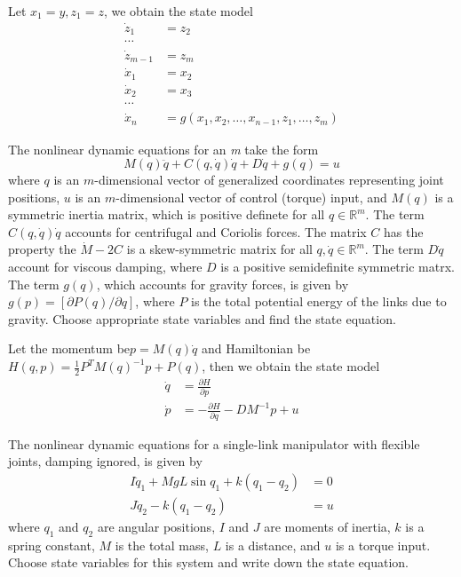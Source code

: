 \begin{solution}
Let $x_1=y,z_1=z$, we obtain the state model
\begin{align*}
\dot{z}_1 & = z_2\\
\cdots \\
\dot{z}_{m-1} & = z_m\\
\dot{x}_1 & = x_2\\ 
\dot{x}_2 & = x_3\\
\cdots \\
\dot{x}_n & = g(x_1,x_2,\dots,x_{n-1},z_1,\dots,z_{m})
\end{align*}
\end{solution}

\begin{exer}
The nonlinear dynamic equations for an \textit{m} take the form
\begin{equation*}
M(q)\ddot{q}+C(q,\dot{q})\dot{q}+D\dot{q}+g(q)=u
\end{equation*}
where $q$ is an $m$-dimensional vector of generalized coordinates representing joint
positions, $u$ is an $m$-dimensional vector of control (torque) input, and $M(q)$ is
a symmetric inertia matrix, which is positive definete for all $q\in\mathbb{R}^m$.
The term $C(q,\dot{q})\dot{q}$ accounts for centrifugal and Coriolis forces. The 
matrix $C$ has the property the $\dot{M}-2C$ is a skew-symmetric matrix for all 
$q,\dot{q}\in\mathbb{R}^m$. The term $D\dot{q}$ account for viscous damping, where 
$D$ is a positive semidefinite symmetric matrx. The term $g(q)$, which accounts for
gravity forces, is given by $g(p)=\left[\partial P(q)/\partial q\right]$, where $P$
is the total potential energy of the links due to gravity. Choose appropriate state
variables and find the state equation.
\end{exer}

\begin{solution}
Let the momentum be$p=M(q)\dot{q}$ and Hamiltonian be 
$H(q,p)=\frac{1}{2}P^TM(q)^{-1}p+P(q)$, then we obtain the state model
\begin{align*}
\dot{q} & = \frac{\partial H}{\partial p} \\
\dot{p} & =-\frac{\partial H}{\partial q} - DM^{-1}p + u
\end{align*}
\end{solution}

\begin{exer}
The nonlinear dynamic equations for a single-link manipulator with flexible joints,
damping ignored, is given by
\begin{align*}
I\ddot{q}_1 + MgL\sin q_1 + k(q_1-q_2) &= 0 \\
J\ddot{q}_2 - k(q_1-q_2) &= u
\end{align*}
where $q_1$ and $q_2$ are angular positions, $I$ and $J$ are moments of inertia, $k$
is a spring constant, $M$ is the total mass, $L$ is a distance, and $u$ is a torque
input. Choose state variables for this system and write down the state equation.
\end{exer}

